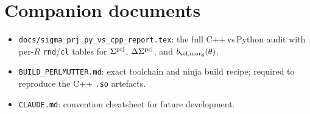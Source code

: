 \documentclass[a4paper, 11pt]{article}
\newcommand{\Sprj}{\Sigma^{\rm prj}}
\newcommand{\DSprj}{\Delta\Sigma^{\rm prj}}
\newcommand{\modname}[1]{\textcolor{kwcol}{\texttt{#1}}}
\begin{document}
\section{Companion documents}

\begin{itemize}
  \setlength\itemsep{1pt}
  \item \modname{docs/sigma\_prj\_py\_vs\_cpp\_report.tex}: the full
    C++\,vs\,Python audit with per-$R$ \texttt{rnd}/\texttt{cl}
    tables for $\Sprj$, $\DSprj$, and $b_{\rm sel,marg}(\theta)$.
  \item \modname{BUILD\_PERLMUTTER.md}: exact toolchain and ninja build
    recipe; required to reproduce the C++ \texttt{.so} artefacts.
  \item \modname{CLAUDE.md}: convention cheatsheet for future
    development.
\end{itemize}
\end{document}
